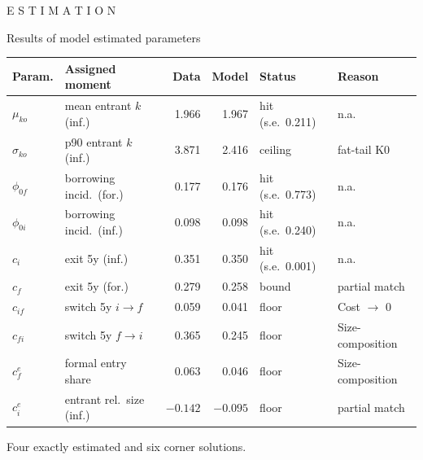 \documentclass[11pt,aspectratio=169]{beamer}
\providecommand{\infml}{i}
\providecommand{\fml}{f}
\begin{document}

\begin{frame}[noframenumbering]{}

\centering
\Huge
E S T I M A T I O N

\end{frame}
 

\begin{frame}{Results of model estimated parameters}
\begin{center}
\renewcommand{\arraystretch}{1.12}
\begin{tabular}{llrrll}
\toprule
Param. & Assigned moment & Data & Model & Status & Reason \\
\midrule
$\mu_{ko}$ & mean entrant $k$ (inf.) & 1.966 & 1.967 & hit
 \;(s.e.\ 0.211) & n.a. \\
$\sigma_{ko}$ & p90 entrant $k$ (inf.) & 3.871 & 2.416 & ceiling & fat-tail K0 \\
$\phi_{0f}$ & borrowing incid.\ (for.) & 0.177 & 0.176 & hit
 \;(s.e.\ 0.773) & n.a. \\
$\phi_{0i}$ & borrowing incid.\ (inf.) & 0.098 & 0.098 &
 hit \;(s.e.\ 0.240) & n.a. \\
$c_i$ & exit 5y (inf.) & 0.351 & 0.350 & hit
 \;(s.e.\ 0.001) & n.a. \\
$c_f$ & exit 5y (for.) & 0.279 & 0.258 & bound & partial match \\
$c_{if}$ & switch 5y $\infml{\to}\fml$ & 0.059 & 0.041 &
 floor & Cost $\to$ 0 \\
$c_{fi}$ & switch 5y $\fml{\to}\infml$ & 0.365 & 0.245 &
 floor & Size-composition \\
$c^e_f$ & formal entry share & 0.063 & 0.046 & floor & Size-composition  \\
$c^e_i$ & entrant rel.\ size (inf.) & $-0.142$ & $-0.095$ & floor & partial match  \\
\bottomrule
\end{tabular}
\end{center}
\smallskip
Four exactly estimated and six corner solutions.
\end{frame}
 
\end{document}
